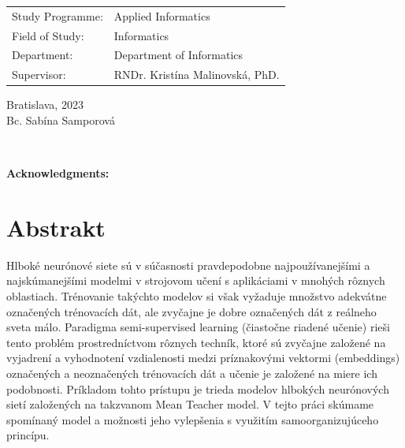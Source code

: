 \documentclass[12pt, twoside]{book}
\def\mfrok{2023}
\def\mfautor{Bc. Sabína Samporová}
\def\mfskolitel{RNDr. Kristína Malinovská, PhD.}
\def\mfkonzultant{tit. Meno Priezvisko, tit. }
\def\mfmiesto{Bratislava, \mfrok}
\def\mfodbor{Informatics}
\def\program{Applied Informatics}
\def\mfpracovisko{ Department of Informatics}
\begin{document}
\vfill

\noindent
\begin{tabular}{ll}
Study Programme: & \program \\
Field of Study: & \mfodbor \\
Department: & \mfpracovisko \\
Supervisor: & \mfskolitel \\
\end{tabular}

\vfill


\noindent \mfmiesto\\
\mfautor

\cleardoublepage



\newpage
\setcounter{page}{2}






\newpage
\pagestyle{plain}
~

\vfill
{\bf Acknowledgments:} %



\newpage 
\section*{Abstrakt}

\color{red}
Hlboké neurónové siete sú v súčasnosti pravdepodobne najpoužívanejšími a najskúmanejšími modelmi v strojovom učení s aplikáciami v mnohých rôznych oblastiach. Trénovanie takýchto modelov si však vyžaduje množstvo adekvátne označených trénovacích dát, ale zvyčajne je dobre označených dát z reálneho sveta málo. Paradigma semi-supervised learning (čiastočne riadené učenie) rieši tento problém prostredníctvom rôznych techník, ktoré sú zvyčajne založené na vyjadrení a vyhodnotení vzdialenosti medzi príznakovými vektormi (embeddings) označených a neoznačených trénovacích dát a učenie je založené na miere ich podobnosti. Príkladom tohto prístupu je trieda modelov hlbokých neurónových sietí založených na takzvanom Mean Teacher model. V tejto práci skúmame spomínaný model a možnosti jeho vylepšenia s využitím samoorganizujúceho princípu.
\end{document}
